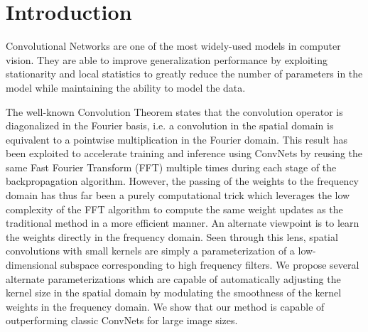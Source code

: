 \documentclass{article}
\begin{document}
 


\begin{abstract} 

\end{abstract} 

\section{Introduction}

Convolutional Networks are one of the most widely-used models in computer vision. 
They are able to improve generalization performance by exploiting stationarity and local statistics to greatly reduce the number of parameters in the model while maintaining the ability to model the data. 

The well-known Convolution Theorem states that the convolution operator is diagonalized in the Fourier basis, i.e. a convolution in the spatial domain is equivalent to a pointwise multiplication in the Fourier domain. 
This result has been exploited to accelerate training and inference using ConvNets by reusing the same Fast Fourier Transform (FFT) multiple times during each stage of the backpropagation algorithm.
However, the passing of the weights to the frequency domain has thus far been a purely computational trick which leverages the low complexity of the FFT algorithm to compute the same weight updates as the traditional method in a more efficient manner.
An alternate viewpoint is to learn the weights directly in the frequency domain. 
Seen through this lens, spatial convolutions with small kernels are simply a parameterization of a low-dimensional subspace corresponding to high frequency filters. 
We propose several alternate parameterizations which are capable of automatically adjusting the kernel size in the spatial domain by modulating the smoothness of the kernel weights in the frequency domain. 
We show that our method is capable of outperforming classic ConvNets for large image sizes. 
\end{document}

